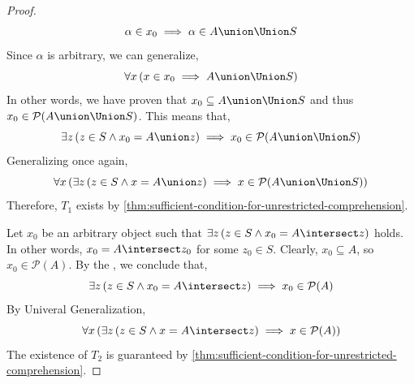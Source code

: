 \begin{proof}
    \begin{equation*}
        \alpha \in x_{0} \implies \alpha \in A \union \Union S
    \end{equation*}
    Since \( \alpha \) is arbitrary, we can generalize,
    \begin{equation*}
        \forall x \, \mleft( x \in x_{0} \implies A \union \Union S \mright)
    \end{equation*}
    In other words, we have proven that \( x_{0} \subseteq A \union \Union S \) and thus \( x_{0} \in \mathcal{P}(A \union \Union S) \).
    This means that,
    \begin{equation*}
        \exists z \, \mleft( z \in S \land x_{0} = A \union z \mright) \implies x_{0} \in \mathcal{P}(A \union \Union S)
    \end{equation*}
    Generalizing once again,
    \begin{equation*}
        \forall x \, \mleft( \exists z \, \mleft( z \in S \land x = A \union z \mright) \implies x \in \mathcal{P}(A \union \Union S) \mright)
    \end{equation*}
    Therefore, \( T_{1} \) exists by \cref{thm:sufficient-condition-for-unrestricted-comprehension}.

    \vspace{0.5cm}
    \noindent
    Let \( x_{0} \) be an arbitrary object such that \( \exists z \, \mleft( z \in S \land x_{0} = A \intersect z \mright) \) holds.
    In other words, \( x_{0} = A \intersect z_{0} \) for some \( z_{0} \in S \).
    Clearly, \( x_{0} \subseteq A \), so \( x_{0} \in \mathcal{P}(A) \).
    By the , we conclude that,
    \begin{equation*}
        \exists z \, \mleft( z \in S \land x_{0} = A \intersect z \mright)
        \implies
        x_{0} \in \mathcal{P}(A)
    \end{equation*}
    By Univeral Generalization,
    \begin{equation*}
        \forall x \, \mleft( \exists z \, \mleft( z \in S \land x = A \intersect z \mright) \implies x \in \mathcal{P}(A) \mright)
    \end{equation*}
    The existence of \( T_{2} \) is guaranteed by \cref{thm:sufficient-condition-for-unrestricted-comprehension}.


\end{proof}
